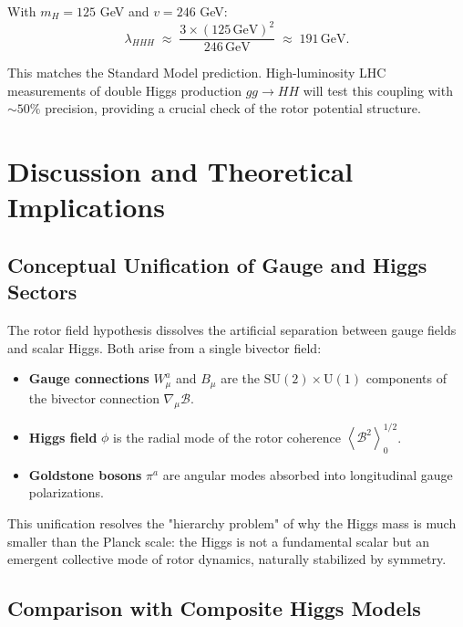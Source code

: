 \documentclass[11pt,a4paper]{article}
\newcommand{\grade}[2]{\left\langle #1 \right\rangle_{#2}}
\newcommand{\scal}[1]{\grade{#1}{0}}
\newcommand{\Biv}{\mathcal{B}}
\newcommand{\D}{\nabla}                        %
\newcommand{\SU}{\mathrm{SU}}
\newcommand{\U}{\mathrm{U}}
\theoremstyle{definition}
\theoremstyle{plain}
\theoremstyle{remark}
\begin{document}
With $m_H = 125$ GeV and $v = 246$ GeV:
\begin{equation}
  \lambda_{HHH} \;\approx\; \frac{3 \times (125\,\text{GeV})^2}{246\,\text{GeV}} \;\approx\; 191\,\text{GeV}.
\end{equation}

This matches the Standard Model prediction. High-luminosity LHC measurements of double Higgs production $gg \to HH$ will test this coupling with $\sim 50\%$ precision, providing a crucial check of the rotor potential structure.

\vspace{1em}

\section{Discussion and Theoretical Implications}\label{sec:discussion}

\subsection{Conceptual Unification of Gauge and Higgs Sectors}

The rotor field hypothesis dissolves the artificial separation between gauge fields and scalar Higgs. Both arise from a single bivector field:
\begin{itemize}[leftmargin=*,itemsep=3pt]
  \item \textbf{Gauge connections} $W_\mu^a$ and $B_\mu$ are the $\SU(2) \times \U(1)$ components of the bivector connection $\D_\mu\Biv$.
  \item \textbf{Higgs field} $\phi$ is the radial mode of the rotor coherence $\scal{\Biv^2}^{1/2}$.
  \item \textbf{Goldstone bosons} $\pi^a$ are angular modes absorbed into longitudinal gauge polarizations.
\end{itemize}

This unification resolves the "hierarchy problem" of why the Higgs mass is much smaller than the Planck scale: the Higgs is not a fundamental scalar but an emergent collective mode of rotor dynamics, naturally stabilized by symmetry.

\subsection{Comparison with Composite Higgs Models}
\end{document}
